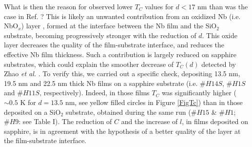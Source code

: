 \documentclass[reprint,onecolumn,superscriptaddress,a4paper,nofootinbib,floatfix]{revtex4-1}
\begin{document}
What is then the reason for observed lower $T_C$ values for $d < 17$ nm than was the case in Ref. \cite{Zhao} ? This is likely an unwanted contribution from an oxidized Nb (i.e. NbO$_x$) layer \cite{Gershenzon}, formed at the interface between the Nb film and the SiO$_2$ substrate, becoming progressively stronger with the reduction of $d$. This oxide layer decreases the quality of the film-substrate interface, and reduces the effective Nb film thickness. Such a contribution is largely reduced on sapphire substrates, which could explain the smoother decrease of $T_C(d)$ detected by Zhao \textit{et al.} \cite{Zhao}. To verify this, we carried out a specific check, depositing 13.5 nm, 19.5 nm and 22.5 nm thick Nb films on a sapphire substrate (i.e. $\#H14S$, $\#H1S$ and $\#H11S$, respectively). Indeed, in those films $T_C$ was significantly higher ($\sim 0.5$ K for $d = 13.5$ nm, see yellow filled circles in Figure \ref{FigTc}) than in those deposited on a SiO$_2$ substrate, obtained during the same run ($\#H15$ \& $\#H1$; $\#H9$: see Table I). The reduction of $C$ and the increase of $l$, in films deposited on sapphire, is in agreement with the hypothesis of a better quality of the layer at the film-substrate interface.
\end{document}
